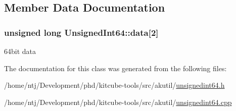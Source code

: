 \subsection{Member Data Documentation}
\hypertarget{classUnsignedInt64_a34f0d86cf4dd2f0523e1c844d169eaa9}{
\subsubsection[{data}]{\setlength{\rightskip}{0pt plus 5cm}unsigned long Unsigned\-Int64\-::data\mbox{[}2\mbox{]}\hspace{0.3cm}{\ttfamily [private]}}}\label{classUnsignedInt64_a34f0d86cf4dd2f0523e1c844d169eaa9}
64bit data 

The documentation for this class was generated from the following files\-:\begin{DoxyCompactItemize}
\item 
/home/ntj/\-Development/phd/kitcube-\/tools/src/akutil/\hyperlink{unsignedint64_8h}{unsignedint64.\-h}\item 
/home/ntj/\-Development/phd/kitcube-\/tools/src/akutil/\hyperlink{unsignedint64_8cpp}{unsignedint64.\-cpp}\end{DoxyCompactItemize}
